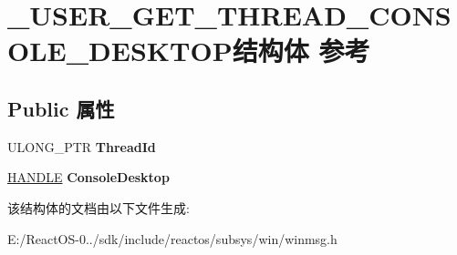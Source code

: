 \hypertarget{struct___u_s_e_r___g_e_t___t_h_r_e_a_d___c_o_n_s_o_l_e___d_e_s_k_t_o_p}{}\section{\+\_\+\+U\+S\+E\+R\+\_\+\+G\+E\+T\+\_\+\+T\+H\+R\+E\+A\+D\+\_\+\+C\+O\+N\+S\+O\+L\+E\+\_\+\+D\+E\+S\+K\+T\+O\+P结构体 参考}
\label{struct___u_s_e_r___g_e_t___t_h_r_e_a_d___c_o_n_s_o_l_e___d_e_s_k_t_o_p}
\subsection*{Public 属性}
\begin{DoxyCompactItemize}
\item 
\mbox{\label{struct___u_s_e_r___g_e_t___t_h_r_e_a_d___c_o_n_s_o_l_e___d_e_s_k_t_o_p_a8a7f7974675ee4f274ca0cc2fa3f7f24}} 
U\+L\+O\+N\+G\+\_\+\+P\+TR {\bfseries Thread\+Id}
\item 
\mbox{\label{struct___u_s_e_r___g_e_t___t_h_r_e_a_d___c_o_n_s_o_l_e___d_e_s_k_t_o_p_a129f39db9075374e016d9b88e91d9fb1}} 
\hyperlink{interfacevoid}{H\+A\+N\+D\+LE} {\bfseries Console\+Desktop}
\end{DoxyCompactItemize}


该结构体的文档由以下文件生成\+:\begin{DoxyCompactItemize}
\item 
E\+:/\+React\+O\+S-\/0../sdk/include/reactos/subsys/win/winmsg.\+h\end{DoxyCompactItemize}
